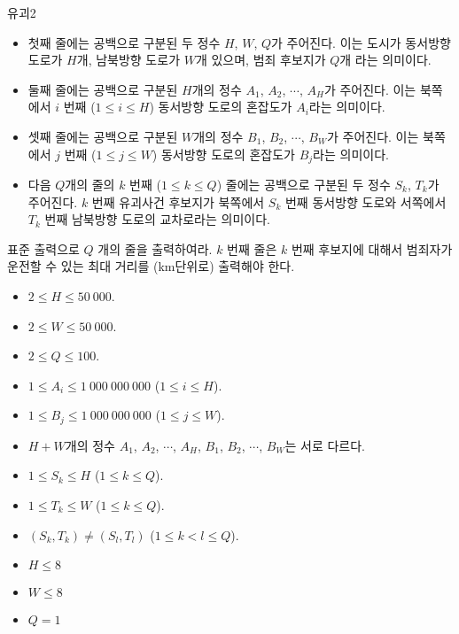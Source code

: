 \begin{problem}{유괴2}
	\begin{itemize}
		\item 첫째 줄에는 공백으로 구분된 두 정수 $H$, $W$, $Q$가 주어진다. 이는 도시가 동서방향 도로가 $H$개, 남북방향 도로가 $W$개 있으며, 범죄 후보지가 $Q$개 라는 의미이다.
		\item 둘째 줄에는 공백으로 구분된 $H$개의 정수 $A_1$, $A_2$, $\cdots$, $A_H$가 주어진다. 이는 북쪽에서 $i$ 번째 ($1 \le i \le H$) 동서방향 도로의 혼잡도가 $A_i$라는 의미이다.
		\item 셋째 줄에는 공백으로 구분된 $W$개의 정수 $B_1$, $B_2$, $\cdots$, $B_W$가 주어진다. 이는 북쪽에서 $j$ 번째 ($1 \le j \le W$) 동서방향 도로의 혼잡도가 $B_j$라는 의미이다.
		\item 다음 $Q$개의 줄의 $k$ 번째 ($1 \le k \le Q$) 줄에는 공백으로 구분된 두 정수 $S_k$, $T_k$가 주어진다. $k$ 번째 유괴사건 후보지가 북쪽에서 $S_k$ 번째 동서방향 도로와 서쪽에서 $T_k$ 번째 남북방향 도로의 교차로라는 의미이다.
	\end{itemize}

	
	\OutputFile
	
	표준 출력으로 $Q$ 개의 줄을 출력하여라. $k$ 번째 줄은 $k$ 번째 후보지에 대해서 범죄자가 운전할 수 있는 최대 거리를 (km단위로) 출력해야 한다.
	
	\Constraints
	
	\begin{itemize}
	
	\item $2 \le H \le 50\ 000$.	
	\item $2 \le W \le 50\ 000$.	
	\item $2 \le Q \le 100$.	
	\item $1 \le A_i \le 1\ 000\ 000\ 000$ ($1 \le i \le H$).	
	\item $1 \le B_j \le 1\ 000\ 000\ 000$ ($1 \le j \le W$).
	\item $H+W$개의 정수 $A_1$, $A_2$, $\cdots$, $A_H$, $B_1$, $B_2$, $\cdots$, $B_W$는 서로 다르다.
	\item $1 \le S_k \le H$ ($1 \le k \le Q$).
	\item $1 \le T_k \le W$ ($1 \le k \le Q$).
	\item $(S_k, T_k) \ne (S_l, T_l)$ ($1 \le k < l \le Q$).
	\end{itemize}
	
	
	\begin{itemize}
		\item $H \le 8$
		\item $W \le 8$
		\item $Q = 1$
	\end{itemize}



\end{problem}
